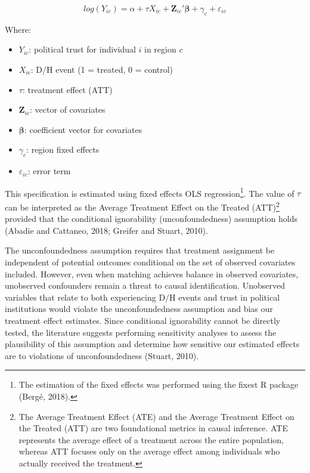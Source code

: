 \documentclass{article}
\begin{document}
\begin{equation}
\label{eq:1}
log(Y_{ic}) = \alpha + \tau X_{ic} + \mathbf{Z}_{ic}'\mathbf{\beta} + \gamma_c + \varepsilon_{ic}
\end{equation}

Where:
\begin{itemize}
  \item \( Y_{ic} \): political trust for individual \( i \) in region \( c \)
  \item \( X_{ic} \): D/H event (1 = treated, 0 = control)
  \item \( \tau \): treatment effect (ATT)
  \item \( \mathbf{Z}_{ic} \): vector of covariates
  \item \( \mathbf{\beta} \): coefficient vector for covariates
  \item \( \gamma_c \): region fixed effects
  \item \( \varepsilon_{ic} \): error term
\end{itemize}

This specification is estimated using fixed effects OLS regression\footnote{The estimation of the fixed effects was performed using the fixest R package (Bergé, 2018).}. The value of \( \tau \) can be interpreted as the Average Treatment Effect on the Treated (ATT)\footnote{The Average Treatment Effect (ATE) and the Average Treatment Effect on the Treated (ATT) are two foundational metrics in causal inference. ATE represents the average effect of a treatment across the entire population, whereas ATT focuses only on the average effect among individuals who actually received the treatment.} provided that the conditional ignorability (unconfoundedness) assumption holds (Abadie and Cattaneo, 2018; Greifer and Stuart, 2010).

The unconfoundedness assumption requires that treatment assignment be independent of potential outcomes conditional on the set of observed covariates included. However, even when matching achieves balance in observed covariates, unobserved confounders remain a threat to causal identification. Unobserved variables that relate to both experiencing D/H events and trust in political institutions would violate the unconfoundedness assumption and bias our treatment effect estimates. Since conditional ignorability cannot be directly tested, the literature suggests performing sensitivity analyses to assess the plausibility of this assumption and determine how sensitive our estimated effects are to violations of unconfoundedness (Stuart, 2010).
\end{document}
